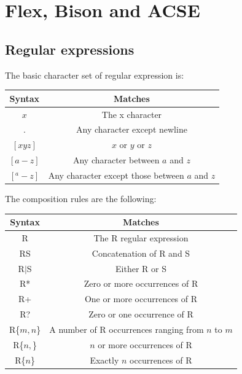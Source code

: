 \documentclass[12pt, a4paper]{report}
\begin{document}
    


\newpage 

\chapter{Flex, Bison and ACSE}
    \section{Regular expressions}
    The basic character set of regular expression is: 
    \begin{table}[H]
        \centering
        \begin{tabular}{cc}
        \hline
        \textbf{Syntax} & \textbf{Matches}                               \\ \hline
        $x$             & The x character                                \\
        $.$             & Any character except newline                   \\
        $[xyz]$         & $x$ or $y$ or $z$                              \\
        $[a-z]$         & Any character between $a$ and $z$              \\
        $[^a-z]$        & Any character except those between $a$ and $z$ \\ \hline
        \end{tabular}
    \end{table}
    The composition rules are the following: 
    \begin{table}[H]
        \centering
        \begin{tabular}{cc}
        \hline
        \textbf{Syntax} & \textbf{Matches}                                  \\ \hline
        R               & The R regular expression                          \\
        RS              & Concatenation of R and S                          \\
        R$|$S             & Either R or S                                     \\
        R*              & Zero or more occurrences of R                     \\
        R+              & One or more occurrences of R                      \\
        R?              & Zero or one occurrence of R                       \\
        R\{$m,n$\}      & A number of R occurrences ranging from $n$ to $m$ \\
        R\{$n,$\}       & $n$ or more occurrences of R                      \\
        R\{$n$\}        & Exactly $n$ occurrences of R                      \\ \hline
        \end{tabular}
    \end{table}
\end{document}
